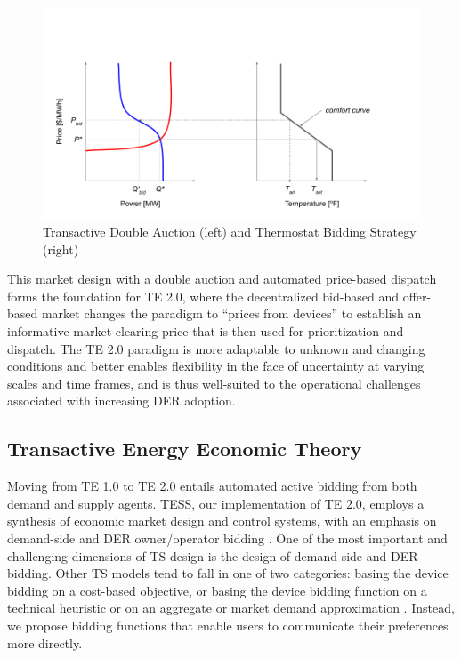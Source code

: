 \begin{figure}[t]
\centering
\includegraphics[scale=0.5]{images/TE_DA.png}
\caption{Transactive Double Auction (left) and Thermostat Bidding Strategy (right)}
\label{fig:Transactive_DA}
\end{figure}

This market design with a double auction and automated price-based dispatch forms the foundation for TE 2.0, where the decentralized bid-based and offer-based market changes the paradigm to ``prices from devices'' to establish an informative market-clearing price that is then used for prioritization and dispatch. The TE 2.0 paradigm is more adaptable to unknown and changing conditions and better enables flexibility in the face of uncertainty at varying scales and time frames, and is thus well-suited to the operational challenges associated with increasing DER adoption.

\subsection{Transactive Energy Economic Theory}\label{sec:teecon}

Moving from TE 1.0 to TE 2.0 entails automated active bidding from both demand and supply agents. TESS, our implementation of TE 2.0, employs a synthesis of economic market design and control systems, with an emphasis on demand-side and DER owner/operator bidding \citep{chassin2017thesis}. One of the most important and challenging dimensions of TS design is the design of demand-side and DER bidding. Other TS models tend to fall in one of two categories: basing the device bidding on a cost-based objective, or basing the device bidding function on a technical heuristic or on an aggregate or market demand approximation \citep[Chapter IV]{Arlt2020}. Instead, we propose bidding functions that enable users to communicate their preferences more directly.

